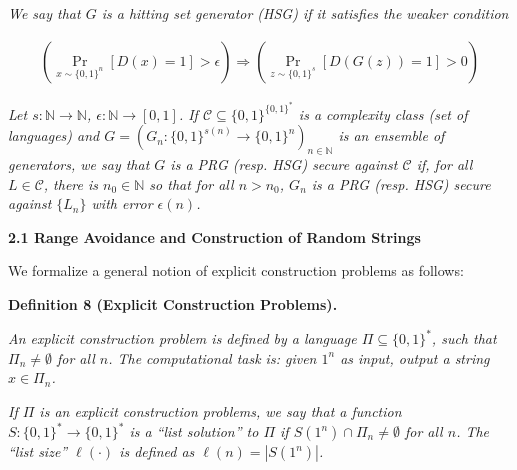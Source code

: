\documentclass[10pt,a4paper]{article}
\begin{document}
\emph{We say that $G$ is a hitting set generator (HSG) if it satisfies the weaker condition}\par


\[\begin{gathered}
(\Pr_{x\sim\{0,1\}^{n}}[D(x)=1]>\epsilon)\Rightarrow(\Pr_{z\sim\{0,1\}^{s}}[D(G(z))=1]>0)
\end{gathered}\]




\emph{Let $s:\mathbb{N}\to\mathbb{N}$, $\epsilon:\mathbb{N}\to[0,1]$. If $\mathcal{C}\subseteq\{0,1\}^{\{0,1\}^{*}}$ is a complexity class (set of languages) and $G=(G_{n}:\{0,1\}^{s(n)}\to\{0,1\}^{n})_{n\in\mathbb{N}}$ is an ensemble of generators, we say that $G$ is a PRG (resp. HSG) secure against $\mathcal{C}$ if, for all $L\in\mathcal{C}$, there is $n_{0}\in\mathbb{N}$ so that for all $n>n_{0}$, $G_{n}$ is a PRG (resp. HSG) secure against $\{L_{n}\}$ with error $\epsilon(n)$.}\par






\par\medskip\noindent\textbf{
2.1 Range Avoidance and Construction of Random Strings}\par




We formalize a general notion of explicit construction problems as follows:\par





\par\medskip\noindent\textbf{
\textbf{Definition 8}\textbf{ }(Explicit Construction Problems)\textbf{.}
}\par



\emph{An explicit construction problem is defined by a language $\Pi\subseteq\{0,1\}^{*}$, such that $\Pi_{n}\neq\emptyset$ for all $n$. The computational task is: given $1^{n}$ as input, output a string $x\in\Pi_{n}$.}\par




\emph{If $\Pi$ is an explicit construction problems, we say that a function $S:\{0,1\}^{*}\to\{0,1\}^{*}$ is a “list solution” to $\Pi$ if $S(1^{n})\cap\Pi_{n}\neq\emptyset$ for all $n$. The “list size” $\ell(\cdot)$ is defined as $\ell(n)=|S(1^{n})|$.}\par
\end{document}
